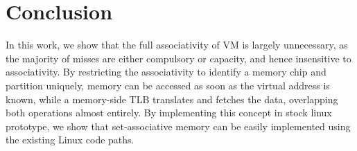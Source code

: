 \section{Conclusion}
\label{sec:conclusion}

In this work, we show that the full associativity of VM is largely unnecessary, as the majority of misses are either compulsory or capacity, and hence insensitive to associativity. By restricting the associativity to identify a memory chip and partition uniquely, memory can be accessed as soon as the virtual address is known, while a memory-side TLB translates and fetches the data, overlapping both operations almost entirely. By implementing this concept in stock linux prototype, we show that set-associative memory can be easily implemented using the existing Linux code paths. 




\newpage
